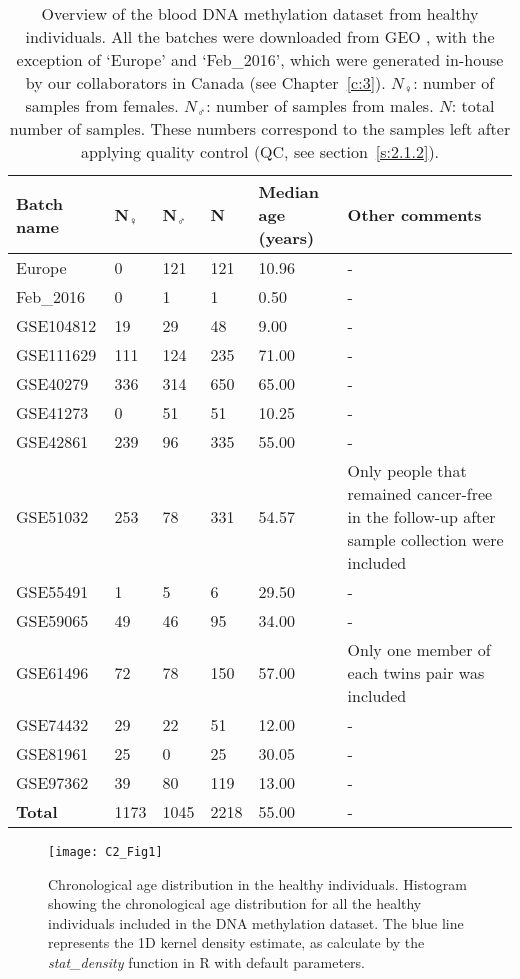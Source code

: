 \begin{table}
\small
	\begin{tabular}{ p{2cm} p{1cm} p{1cm} p{1cm} p{2cm} p{6cm} }
		\toprule
		\textbf{Batch name} & \textbf{N$_{\female}$} & \textbf{N$_{\male}$} & \textbf{N} & \textbf{Median age (years)} & \textbf{Other comments} \\
		\midrule
		Europe & 0 & 121 & 121 & 10.96 & - \\
		Feb\_2016 & 0 & 1 & 1 & 0.50 & - \\
		GSE104812 & 19 & 29 & 48 & 9.00 & - \\
		GSE111629 & 111 & 124 & 235 &  71.00 & - \\
		GSE40279 & 336 & 314 & 650 & 65.00 & - \\
		GSE41273 & 0 & 51 & 51 & 10.25 & - \\
		GSE42861 & 239 & 96 & 335 & 55.00 & - \\
		GSE51032 & 253 & 78 & 331 & 54.57 & Only people that remained cancer-free in the follow-up after sample collection were included  \\
		GSE55491 & 1 & 5 & 6 & 29.50 & - \\
		GSE59065 & 49 & 46 & 95 & 34.00 & - \\
		GSE61496 & 72 & 78 & 150 & 57.00 & Only one member of each twins pair was included \\
		GSE74432 & 29 & 22 & 51 & 12.00 & - \\
		GSE81961 & 25 & 0 & 25 & 30.05 & - \\
		GSE97362 & 39 & 80 & 119 & 13.00 & - \\
		\midrule
		\textbf{Total} & 1173 & 1045 & 2218 & 55.00 & - \\ 
		\bottomrule
	\end{tabular}
	\vspace*{3mm}
	\caption[Overview of the blood DNA methylation dataset from healthy individuals]{Overview of the blood DNA methylation dataset from healthy individuals. All the batches were downloaded from GEO \cite{Edgar2002}, with the exception of `Europe' and `Feb\_2016', which were generated in-house by our collaborators in Canada (see Chapter~\ref{c:3}). $N_{\female}$: number of samples from females. $N_{\male}$: number of samples from males. $N$: total number of samples. These numbers correspond to the samples left after applying quality control (QC, see section~\ref{s:2.1.2}).}
	\label{table:c2_table1}
\end{table} 


\begin{figure}[htbp!] 
	\centering    
	\texttt{[image: C2\_Fig1]}
	\vspace*{2mm}
	\caption[Chronological age distribution in the healthy individuals]{Chronological age distribution in the healthy individuals. Histogram showing the chronological age distribution for all the healthy individuals included in the DNA methylation dataset. The blue line represents the 1D kernel density estimate, as calculate by the \textit{stat\_density} function in R with default parameters.}
	\label{fig:c2_fig1}
\end{figure}

